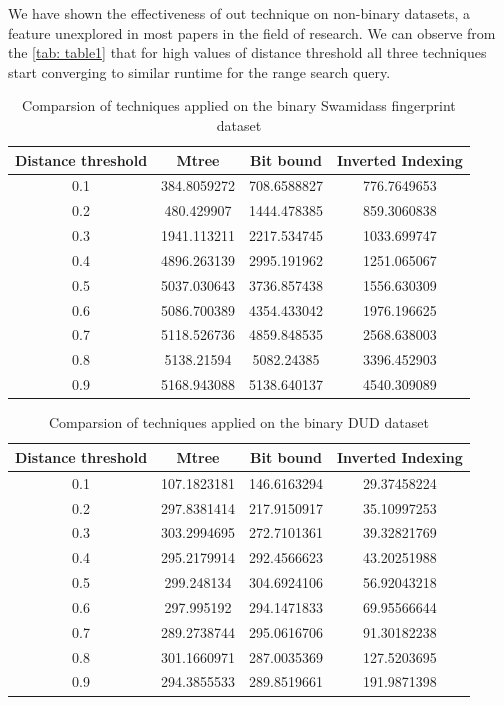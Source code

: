 We have shown the effectiveness of out technique on non-binary datasets, a feature unexplored in most papers in the field of research. We can observe from the \autoref{tab: table1} that for high values of distance threshold all three techniques start converging to similar runtime for the range search query. \\

\begin{table}[ht!]
\centering
\caption{Comparsion of techniques applied on the binary Swamidass fingerprint dataset}
\label{tab: table2}
\begin{tabular}{|c|c|c|c|}
\hline 
Distance threshold & Mtree	& Bit bound	& 	Inverted Indexing \\
\hline
0.1 & 384.8059272 	&	708.6588827 	&	776.7649653\\
0.2 & 480.429907	  	&  	1444.478385	&	859.3060838\\
0.3 & 1941.113211 	&	2217.534745 	&	1033.699747\\
0.4	& 4896.263139 	&	2995.191962 	&	1251.065067\\
0.5	& 5037.030643 	&	3736.857438 	&	1556.630309\\
0.6	& 5086.700389 	&	4354.433042 	&	1976.196625\\
0.7	& 5118.526736 	&	4859.848535 	&	2568.638003\\
0.8	& 5138.21594	 	& 	5082.24385 	&	3396.452903\\
0.9	& 5168.943088	&	5138.640137 	&	4540.309089\\
\hline 
\end{tabular} 
\end{table}




\begin{table}[ht!]
\centering
\caption{Comparsion of techniques applied on the binary DUD dataset}
\label{tab: table3}
\begin{tabular}{|c|c|c|c|}
\hline 
Distance threshold & Mtree	& Bit bound	& 	Inverted Indexing \\
\hline
0.1 	& 107.1823181	& 146.6163294	& 	29.37458224\\
0.2 & 297.8381414	& 217.9150917	& 	35.10997253	\\
0.3 & 303.2994695	& 272.7101361	& 	39.32821769	\\
0.4 & 295.2179914	& 292.4566623	& 	43.20251988	\\
0.5 & 299.248134 	& 304.6924106	& 	56.92043218	\\
0.6 & 297.995192 	& 294.1471833	& 	69.95566644	\\
0.7 & 289.2738744	& 295.0616706	& 	91.30182238	\\
0.8	& 301.1660971	& 287.0035369	& 	127.5203695	\\
0.9 & 294.3855533	& 289.8519661	& 	191.9871398	\\
\hline 
\end{tabular} 
\end{table}



